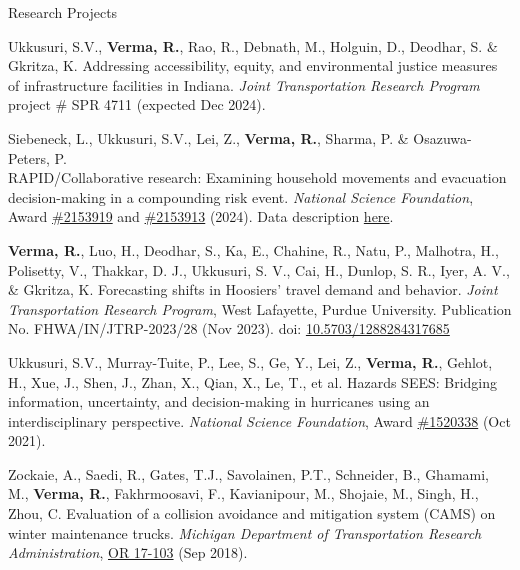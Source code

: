 \documentclass{CV} %
\begin{document}
\begin{rSection}{Research Projects}
    \begin{etaremune}
        \item Ukkusuri, S.V., \textbf{Verma, R.}, Rao, R., Debnath, M., Holguin, D., Deodhar, S. \& Gkritza, K. Addressing accessibility, equity, and environmental justice measures of infrastructure facilities in Indiana. \textit{Joint Transportation Research Program} project \# SPR 4711 (expected Dec 2024).
        
        \item Siebeneck, L., Ukkusuri, S.V., Lei, Z., \textbf{Verma, R.}, Sharma, P. \& Osazuwa-Peters, P. \\
        RAPID/Collaborative research: Examining household movements and evacuation decision-making in a compounding risk event. \textit{National Science Foundation}, Award \href{https://www.nsf.gov/awardsearch/showAward?AWD_ID=2153919}{\#2153919} and \href{https://www.nsf.gov/awardsearch/showAward?AWD_ID=2153913&HistoricalAwards=false}{\#2153913} (2024). Data description \href{https://digital.library.unt.edu/ark:/67531/metadc1872507/}{here}.

        \item \textbf{Verma, R.}, Luo, H., Deodhar, S., Ka, E., Chahine, R., Natu, P., Malhotra, H., Polisetty, V., Thakkar, D. J., Ukkusuri, S. V., Cai, H., Dunlop, S. R., Iyer, A. V., \& Gkritza, K. Forecasting shifts in Hoosiers' travel demand and behavior. \textit{Joint Transportation Research Program}, West Lafayette, Purdue University. Publication No. FHWA/IN/JTRP-2023/28 (Nov 2023). doi: \href{https://doi.org/10.5703/1288284317685}{10.5703/1288284317685}

        \item Ukkusuri, S.V., Murray-Tuite, P., Lee, S., Ge, Y., Lei, Z., \textbf{Verma, R.}, Gehlot, H., Xue, J., Shen, J., Zhan, X., Qian, X., Le, T., et al. Hazards SEES: Bridging information, uncertainty, and decision-making in hurricanes using an interdisciplinary perspective. \textit{National Science Foundation}, Award \href{https://www.nsf.gov/awardsearch/showAward?AWD_ID=1520338}{\#1520338} (Oct 2021).
        
        \item Zockaie, A., Saedi, R., Gates, T.J., Savolainen, P.T., Schneider, B., Ghamami, M., \textbf{Verma, R.}, Fakhrmoosavi, F., Kavianipour, M., Shojaie, M., Singh, H., Zhou, C. Evaluation of a collision avoidance and mitigation system (CAMS) on winter maintenance trucks. \textit{Michigan Department of Transportation Research Administration}, \href{https://rosap.ntl.bts.gov/view/dot/42752}{OR 17-103} (Sep 2018).
    \end{etaremune}

\end{rSection}
\end{document}
